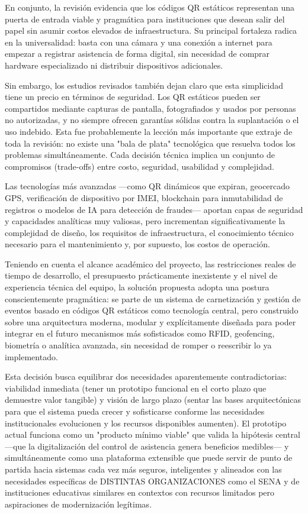 En conjunto, la revisión evidencia que los códigos QR estáticos representan una puerta de entrada viable y pragmática para instituciones que desean salir del papel sin asumir costos elevados de infraestructura. Su principal fortaleza radica en la universalidad: basta con una cámara y una conexión a internet para empezar a registrar asistencia de forma digital, sin necesidad de comprar hardware especializado ni distribuir dispositivos adicionales.

Sin embargo, los estudios revisados también dejan claro que esta simplicidad tiene un precio en términos de seguridad. Los QR estáticos pueden ser compartidos mediante capturas de pantalla, fotografiados y usados por personas no autorizadas, y no siempre ofrecen garantías sólidas contra la suplantación o el uso indebido. Esta fue probablemente la lección más importante que extraje de toda la revisión: no existe una "bala de plata" tecnológica que resuelva todos los problemas simultáneamente. Cada decisión técnica implica un conjunto de compromisos (trade-offs) entre costo, seguridad, usabilidad y complejidad.

Las tecnologías más avanzadas —como QR dinámicos que expiran, geocercado GPS, verificación de dispositivo por IMEI, blockchain para inmutabilidad de registros o modelos de IA para detección de fraudes— aportan capas de seguridad y capacidades analíticas muy valiosas, pero incrementan significativamente la complejidad de diseño, los requisitos de infraestructura, el conocimiento técnico necesario para el mantenimiento y, por supuesto, los costos de operación.

Teniendo en cuenta el alcance académico del proyecto, las restricciones reales de tiempo de desarrollo, el presupuesto prácticamente inexistente y el nivel de experiencia técnica del equipo, la solución propuesta adopta una postura conscientemente pragmática: se parte de un sistema de carnetización y gestión de eventos basado en códigos QR estáticos como tecnología central, pero construido sobre una arquitectura moderna, modular y explícitamente diseñada para poder integrar en el futuro mecanismos más sofisticados como RFID, geofencing, biometría o analítica avanzada, sin necesidad de romper o reescribir lo ya implementado.

Esta decisión busca equilibrar dos necesidades aparentemente contradictorias: viabilidad inmediata (tener un prototipo funcional en el corto plazo que demuestre valor tangible) y visión de largo plazo (sentar las bases arquitectónicas para que el sistema pueda crecer y sofisticarse conforme las necesidades institucionales evolucionen y los recursos disponibles aumenten). El prototipo actual funciona como un "producto mínimo viable" que valida la hipótesis central —que la digitalización del control de asistencia genera beneficios medibles— y simultáneamente como una plataforma extensible que puede servir de punto de partida hacia sistemas cada vez más seguros, inteligentes y alineados con las necesidades específicas de DISTINTAS ORGANIZACIONES como el SENA y de instituciones educativas similares en contextos con recursos limitados pero aspiraciones de modernización legítimas.